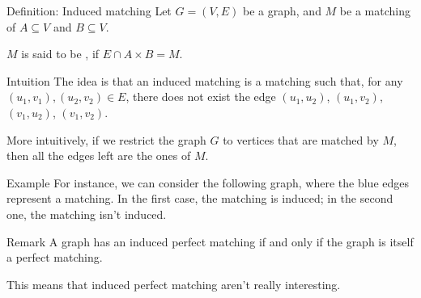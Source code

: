 \documentclass[a4paper]{article}
\begin{document}
\begin{parag}{Definition: Induced matching}
    Let $G = \left(V, E\right)$  be a graph, and $M$ be a matching of $A \subseteq V$ and $B \subseteq V$.

    $M$ is said to be , if $E \cap A \times B = M$.

    \begin{subparag}{Intuition}
        The idea is that an induced matching is a matching such that, for any $\left(u_1, v_1\right), \left(u_2, v_2\right) \in E$, there does not exist the edge $\left(u_1, u_2\right)$, $\left(u_1, v_2\right)$, $\left(v_1, u_2\right)$, $\left(v_1, v_2\right)$.

        More intuitively, if we restrict the graph $G$ to vertices that are matched by $M$, then all the edges left are the ones of $M$.
    \end{subparag}

    \begin{subparag}{Example}
        For instance, we can consider the following graph, where the blue edges represent a matching. In the first case, the matching is induced; in the second one, the matching isn't induced.
    \end{subparag}

    \begin{subparag}{Remark}
        A graph has an induced perfect matching if and only if the graph is itself a perfect matching.

        This means that induced perfect matching aren't really interesting.
    \end{subparag}
\end{parag}
 
\end{document}
